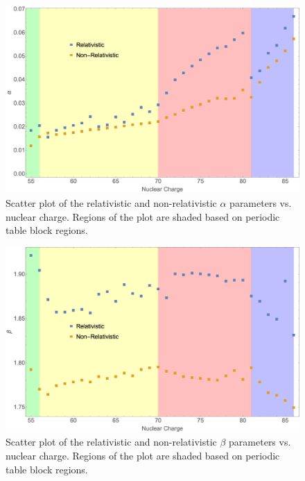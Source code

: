 \begin{figure}
\center
\includegraphics[width=1\textwidth]{Figures/BS_rel_alpha.png}
\caption[Scatter plot of the relativistic and non-relativistic $\alpha$ parameters vs. nuclear charge.]
{Scatter plot of the relativistic and non-relativistic $\alpha$ parameters vs. nuclear charge. Regions of the plot are shaded based on periodic table block regions.}
\label{fig:BS_rel_alpha}
\end{figure}

\begin{figure}
\center
\includegraphics[width=1\textwidth]{Figures/BS_rel_beta.png}
\caption[Scatter plot of the relativistic and non-relativistic $\beta$ parameters vs. nuclear charge.]
{Scatter plot of the relativistic and non-relativistic $\beta$ parameters vs. nuclear charge. Regions of the plot are shaded based on periodic table block regions.}
\label{fig:BS_rel_beta}
\end{figure}

